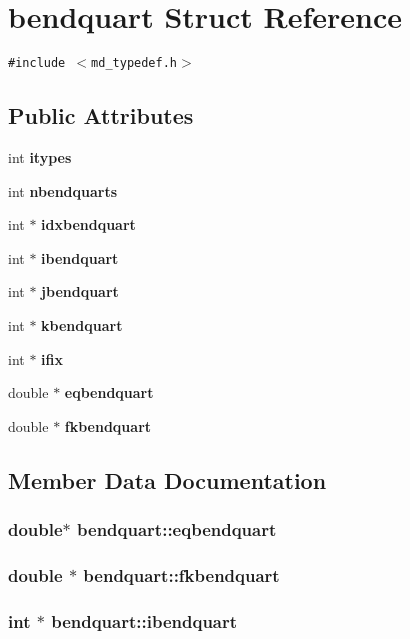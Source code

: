 \section{bendquart Struct Reference}
\label{structbendquart}
{\tt \#include $<$md\_\-typedef.h$>$}

\subsection*{Public Attributes}
\begin{CompactItemize}
\item 
int {\bf itypes}
\item 
int {\bf nbendquarts}
\item 
int $\ast$ {\bf idxbendquart}
\item 
int $\ast$ {\bf ibendquart}
\item 
int $\ast$ {\bf jbendquart}
\item 
int $\ast$ {\bf kbendquart}
\item 
int $\ast$ {\bf ifix}
\item 
double $\ast$ {\bf eqbendquart}
\item 
double $\ast$ {\bf fkbendquart}
\end{CompactItemize}


\subsection{Member Data Documentation}
\subsubsection{\setlength{\rightskip}{0pt plus 5cm}double$\ast$ {\bf bendquart::eqbendquart}}\label{structbendquart_d26f6da9abcad43fd8ded68c94ed7a42}


\subsubsection{\setlength{\rightskip}{0pt plus 5cm}double $\ast$ {\bf bendquart::fkbendquart}}\label{structbendquart_1965a2cdd5c78af585ff2fe66054e708}


\subsubsection{\setlength{\rightskip}{0pt plus 5cm}int $\ast$ {\bf bendquart::ibendquart}}\label{structbendquart_298af64cbaa246b29c3512f54ae55640}


